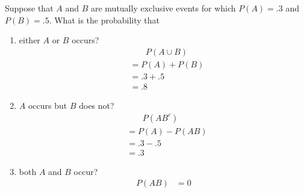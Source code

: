 \item Suppose that $A$ and $B$ are mutually exclusive events for which $P(A) = .3$ and $P(B) = .5$. What is the probability that
\begin{enumerate}
    \item either $A$ or $B$ occurs?
    \begin{align*}
        &\phantom{\;=\;} P(A\cup B)\\
        &= P(A) + P(B)\\
        &= .3 + .5\\
        &= .8
    \end{align*}
    \item $A$ occurs but $B$ does not?
    \begin{align*}
        &\phantom{\;=\;} P(AB^c)\\
        &= P(A) - P(AB)\\
        &= .3 - .5\\
        &= .3
    \end{align*}
    \item both $A$ and $B$ occur?
    \begin{align*}
        P(AB) &= 0
    \end{align*}
\end{enumerate}